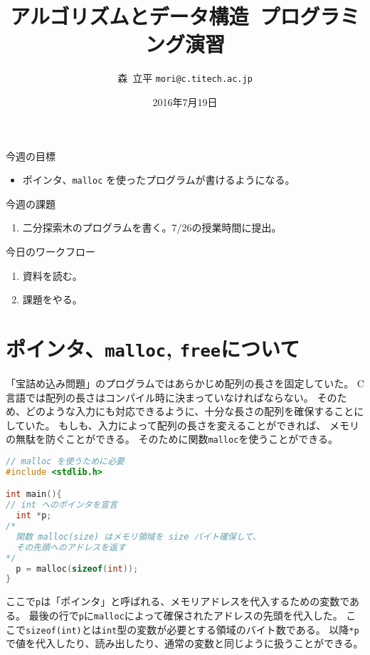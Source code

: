 \documentclass[a4paper,twoside,onecolumn,openany,article]{memoir}
\title{アルゴリズムとデータ構造~プログラミング演習}
\date{2016年7月19日}
\author{森~立平 \texttt{mori@c.titech.ac.jp}}
\theoremstyle{remark}
\begin{document}
\maketitle

\noindent
今週の目標
\begin{itemize}
\item ポインタ、\texttt{malloc} を使ったプログラムが書けるようになる。
\end{itemize}

\noindent
今週の課題
\begin{enumerate}
\item 二分探索木のプログラムを書く。7/26の授業時間に提出。
\end{enumerate}

\vspace{.5em}
\noindent
今日のワークフロー
\begin{enumerate}
\item 資料を読む。
\item 課題をやる。
\end{enumerate}

\section{ポインタ、\texttt{malloc}, \texttt{free}について}
「宝詰め込み問題」のプログラムではあらかじめ配列の長さを固定していた。
C言語では配列の長さはコンパイル時に決まっていなければならない。
そのため、どのような入力にも対応できるように、十分な長さの配列を確保することにしていた。
もしも、入力によって配列の長さを変えることができれば、
メモリの無駄を防ぐことができる。
そのために関数\texttt{malloc}を使うことができる。

\begin{lstlisting}[basicstyle=\ttfamily\small,showstringspaces=false,language=C,frame=single]
// malloc を使うために必要
#include <stdlib.h>

int main(){
// int へのポインタを宣言
  int *p;
/*
  関数 malloc(size) はメモリ領域を size バイト確保して、
  その先頭へのアドレスを返す
*/
  p = malloc(sizeof(int));
}
\end{lstlisting}
ここで\texttt{p}は「ポインタ」と呼ばれる、メモリアドレスを代入するための変数である。
最後の行で\texttt{p}に\texttt{malloc}によって確保されたアドレスの先頭を代入した。
ここで\texttt{sizeof(int)}とは\texttt{int}型の変数が必要とする領域のバイト数である。
以降\texttt{*p}で値を代入したり、読み出したり、通常の変数と同じように扱うことができる。
\end{document}
